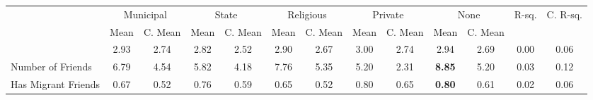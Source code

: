 \begin{tabular}{l c c c c c c c c c c c c}
\toprule
& \multicolumn{2}{c}{Municipal} & \multicolumn{2}{c}{State} & \multicolumn{2}{c}{Religious} & \multicolumn{2}{c}{Private} & \multicolumn{2}{c}{None} & R-sq. & C. R-sq. \\
& \scriptsize Mean & \scriptsize C. Mean & \scriptsize Mean & \scriptsize C. Mean & \scriptsize Mean & \scriptsize C. Mean & \scriptsize Mean & \scriptsize C. Mean & \scriptsize Mean & \scriptsize C. Mean & & \\
\midrule
&      2.93 & 2.74 &      2.82 & 2.52 &      2.90 & 2.67 &      3.00 & 2.74 &      2.94 & 2.69 &      0.00 &      0.06 \\
Number of Friends &      6.79 & 4.54 &      5.82 & 4.18 &      7.76 & 5.35 &      5.20 & 2.31 & \textbf{     8.85} & 5.20 &      0.03 &      0.12 \\
Has Migrant Friends &      0.67 & 0.52 &      0.76 & 0.59 &      0.65 & 0.52 &      0.80 & 0.65 & \textbf{     0.80} & 0.61 &      0.02 &      0.06 \\
\bottomrule
\end{tabular}
